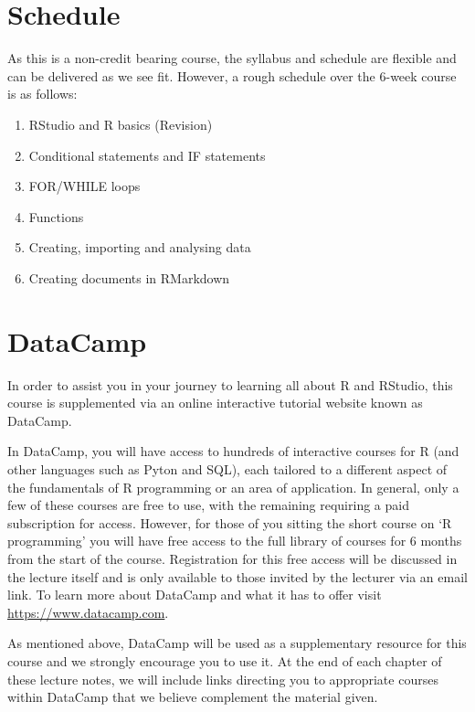 \documentclass[
]{book}
\providecommand{\tightlist}{%
  \setlength{\itemsep}{0pt}\setlength{\parskip}{0pt}}
\theoremstyle{definition}
\theoremstyle{definition}
\theoremstyle{definition}
\theoremstyle{definition}
\theoremstyle{remark}
\begin{document}
\hypertarget{schedule}{%
\section*{Schedule}\label{schedule}}

As this is a non-credit bearing course, the syllabus and schedule are flexible and can be delivered as we see fit. However, a rough schedule over the 6-week course is as follows:

\begin{enumerate}
\def\labelenumi{\arabic{enumi}.}
\tightlist
\item
  RStudio and R basics (Revision)
\item
  Conditional statements and IF statements
\item
  FOR/WHILE loops
\item
  Functions
\item
  Creating, importing and analysing data
\item
  Creating documents in RMarkdown
\end{enumerate}

\hypertarget{datacamp}{%
\section*{DataCamp}\label{datacamp}}

In order to assist you in your journey to learning all about R and RStudio, this course is supplemented via an online interactive tutorial website known as DataCamp.

In DataCamp, you will have access to hundreds of interactive courses for R (and other languages such as Pyton and SQL), each tailored to a different aspect of the fundamentals of R programming or an area of application. In general, only a few of these courses are free to use, with the remaining requiring a paid subscription for access. However, for those of you sitting the short course on `R programming' you will have free access to the full library of courses for 6 months from the start of the course. Registration for this free access will be discussed in the lecture itself and is only available to those invited by the lecturer via an email link. To learn more about DataCamp and what it has to offer visit \url{https://www.datacamp.com}.

As mentioned above, DataCamp will be used as a supplementary resource for this course and we strongly encourage you to use it. At the end of each chapter of these lecture notes, we will include links directing you to appropriate courses within DataCamp that we believe complement the material given.
\end{document}
